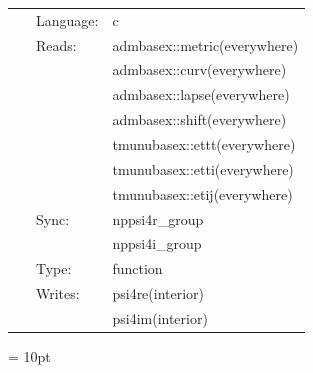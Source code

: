  \begin{tabular*}{160mm}{cll} 
~ & Language:  & c \\ 
~ & Reads:  & admbasex::metric(everywhere) \\ 
~& ~ &admbasex::curv(everywhere)\\ 
~& ~ &admbasex::lapse(everywhere)\\ 
~& ~ &admbasex::shift(everywhere)\\ 
~& ~ &tmunubasex::ettt(everywhere)\\ 
~& ~ &tmunubasex::etti(everywhere)\\ 
~& ~ &tmunubasex::etij(everywhere)\\ 
~ & Sync:  & nppsi4r\_group \\ 
~& ~ &nppsi4i\_group\\ 
~ & Type:  & function \\ 
~ & Writes:  & psi4re(interior) \\ 
~& ~ &psi4im(interior)\\ 
\end{tabular*} 



\vspace{5mm}\parskip = 10pt 

